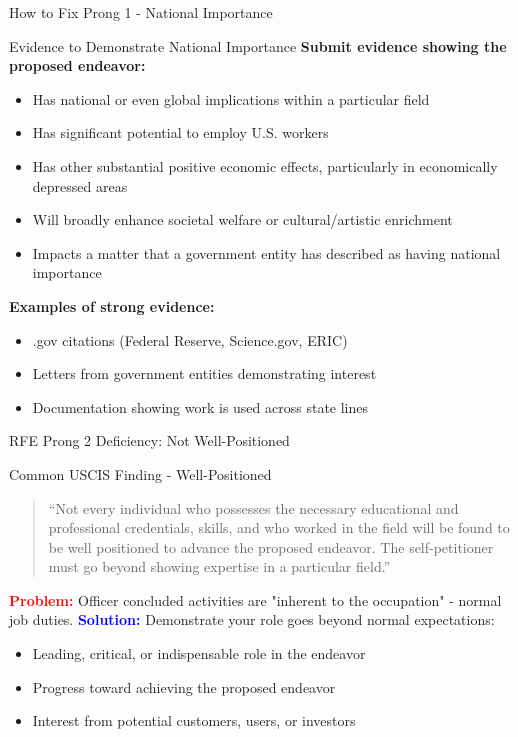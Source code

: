 \documentclass[11pt]{beamer}
\begin{document}
	\begin{frame}{How to Fix Prong 1 - National Importance}
		\scriptsize
		\begin{block}{Evidence to Demonstrate National Importance}
			\textbf{Submit evidence showing the proposed endeavor:}
			\begin{itemize}
				\item Has national or even global implications within a particular field
				\item Has significant potential to employ U.S. workers
				\item Has other substantial positive economic effects, particularly in economically depressed areas
				\item Will broadly enhance societal welfare or cultural/artistic enrichment
				\item Impacts a matter that a government entity has described as having national importance
			\end{itemize}
			\textbf{Examples of strong evidence:}
			\begin{itemize}
				\item .gov citations (Federal Reserve, Science.gov, ERIC)
				\item Letters from government entities demonstrating interest
				\item Documentation showing work is used across state lines
			\end{itemize}
		\end{block}
	\end{frame}
	
	
	\begin{frame}{RFE Prong 2 Deficiency: Not Well-Positioned}
		\scriptsize
		\begin{block}{Common USCIS Finding - Well-Positioned}
			\begin{quote}
				``Not every individual who possesses the necessary educational and professional credentials, skills, and who worked in the field will be found to be well positioned to advance the proposed endeavor. The self-petitioner must go beyond showing expertise in a particular field.''
			\end{quote}
			\textcolor{red}{\textbf{Problem:}} Officer concluded activities are "inherent to the occupation" - normal job duties.
			\vspace{0.2cm}
			\textcolor{blue}{\textbf{Solution:}} Demonstrate your role goes beyond normal expectations:
			\begin{itemize}
				\item Leading, critical, or indispensable role in the endeavor
				\item Progress toward achieving the proposed endeavor
				\item Interest from potential customers, users, or investors
			\end{itemize}
		\end{block}
	\end{frame}
	
\end{document}

